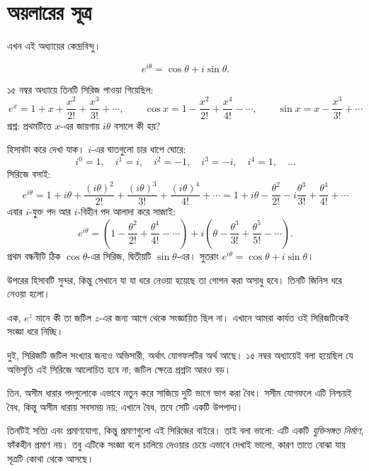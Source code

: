 \documentclass[11pt]{article}
\begin{document}
\section{অয়লারের সূত্র}

এখন এই অধ্যায়ের কেন্দ্রবিন্দু।

\begin{idea}[অয়লার-এর সূত্র]
\[
  e^{i\theta} = \cos\theta + i\sin\theta .
\]
\end{idea}

১৫ নম্বর অধ্যায়ে তিনটি সিরিজ পাওয়া গিয়েছিল:
\[
  e^{x} = 1 + x + \frac{x^{2}}{2!} + \frac{x^{3}}{3!} + \cdots, \qquad
  \cos x = 1 - \frac{x^{2}}{2!} + \frac{x^{4}}{4!} - \cdots, \qquad
  \sin x = x - \frac{x^{3}}{3!} + \cdots
\]
প্রশ্ন: প্রথমটিতে $x$-এর জায়গায় $i\theta$ বসালে কী হয়?

হিসাবটা করে দেখা যাক। $i$-এর ঘাতগুলো চার ধাপে ঘোরে:
\[
  i^{0}=1, \quad i^{1}=i, \quad i^{2}=-1, \quad i^{3}=-i, \quad i^{4}=1,
  \quad \dots
\]
সিরিজে বসাই:
\[
  e^{i\theta} = 1 + i\theta + \frac{(i\theta)^{2}}{2!}
  + \frac{(i\theta)^{3}}{3!} + \frac{(i\theta)^{4}}{4!} + \cdots
  = 1 + i\theta - \frac{\theta^{2}}{2!} - i\frac{\theta^{3}}{3!}
  + \frac{\theta^{4}}{4!} + \cdots
\]
এবার $i$-যুক্ত পদ আর $i$-বিহীন পদ আলাদা করে সাজাই:
\[
  e^{i\theta} = \left( 1 - \frac{\theta^{2}}{2!} + \frac{\theta^{4}}{4!}
  - \cdots \right)
  + i\left( \theta - \frac{\theta^{3}}{3!} + \frac{\theta^{5}}{5!}
  - \cdots \right) .
\]
প্রথম বন্ধনীটি ঠিক $\cos\theta$-এর সিরিজ, দ্বিতীয়টি $\sin\theta$-এর। সুতরাং
$e^{i\theta} = \cos\theta + i\sin\theta$।

\begin{remark}
উপরের হিসাবটি সুন্দর, কিন্তু সেখানে যা যা ধরে নেওয়া হয়েছে তা গোপন করা
অসাধু হবে। তিনটি জিনিস ধরে নেওয়া হলো।

এক, $e^{z}$ মানে কী তা জটিল $z$-এর জন্য আগে থেকে সংজ্ঞায়িত ছিল না। এখানে
আমরা কার্যত ওই সিরিজটিকেই সংজ্ঞা ধরে নিচ্ছি।

দুই, সিরিজটি জটিল সংখ্যার জন্যও অভিসারী, অর্থাৎ যোগফলটির অর্থ আছে। ১৫ নম্বর
অধ্যায়েই বলা হয়েছিল যে অভিসৃতি এই সিরিজে আলোচিত হবে না; জটিল ক্ষেত্রে
প্রশ্নটা আরও বড়।

তিন, অসীম ধারার পদগুলোকে এভাবে নতুন করে সাজিয়ে দুটি ভাগে ভাগ করা বৈধ। সসীম
যোগফলে এটি নিশ্চয়ই বৈধ, কিন্তু অসীম ধারায় সবসময় নয়; এখানে বৈধ, তবে সেটি
একটি উপপাদ্য।

তিনটিই সত্যি এবং প্রমাণযোগ্য, কিন্তু প্রমাণগুলো এই সিরিজের বাইরে। তাই
বলা ভালো: এটি একটি \emph{যুক্তিসঙ্গত নির্মাণ}, ফাঁকহীন প্রমাণ নয়। তবু এটিকে
সংজ্ঞা বলে চালিয়ে দেওয়ার চেয়ে এভাবে দেখাই ভালো, কারণ তাতে বোঝা যায় সূত্রটি
কোথা থেকে আসছে।
\end{remark}
\end{document}
